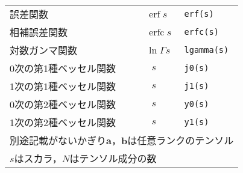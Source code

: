 \begin{longtable}{Xlll}
 誤差関数 &  & $\mathop{\mathrm{erf}} s$ & \verb|erf(s)| \\
 相補誤差関数 &  & $\mathop{\mathrm{erfc}} s$ & \verb|erfc(s)| \\
 対数ガンマ関数 &  & $\ln\Gamma s$ & \verb|lgamma(s)| \\
 0次の第1種ベッセル関数 &  & $\mathop{J_{0}}s$ & \verb|j0(s)| \\
 1次の第1種ベッセル関数 &  & $\mathop{J_{1}}s$ & \verb|j1(s)| \\
 0次の第2種ベッセル関数 &  & $\mathop{Y_{0}}s$ & \verb|y0(s)| \\
 1次の第2種ベッセル関数 &  & $\mathop{Y_{1}}s$ & \verb|y1(s)| \\
 \hline
 \multicolumn{4}{l}{別途記載がないかぎり$\bm{a}$，$\bm{b}$は任意ランクのテンソル} \\
 \multicolumn{4}{l}{$s$はスカラ，$N$はテンソル成分の数} \\
\end{longtable}

